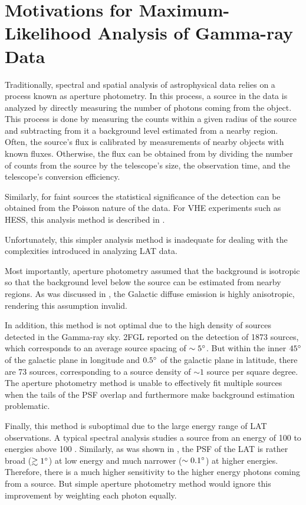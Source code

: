 \section{Motivations for Maximum-Likelihood Analysis of Gamma-ray Data}

Traditionally, spectral and spatial analysis of astrophysical data
relies on a process known as aperture photometry.  In this process,
a source in the data is analyzed by directly measuring the number of
photons coming from the object. This process is done by measuring the
counts within a given radius of the source and subtracting from it a
background level estimated from a nearby region.  Often, the source's
flux is calibrated by measurements of nearby objects with known fluxes.
Otherwise, the flux can be obtained from by dividing the number of
counts from the source by the telescope's size, the observation time,
and the telescope's conversion efficiency.

Similarly, for faint sources the statistical significance of the detection
can be obtained from the Poisson nature of the data. For \ac{VHE}
experiments such as \ac{HESS}, this analysis method is described in
\cite{li_1983_analysis-methods}.

Unfortunately, this simpler analysis method is inadequate for dealing
with the complexities introduced in analyzing LAT data.

Most importantly, aperture photometry assumed that the
background is isotropic so that the background level below the
source can be estimated from nearby regions.  As was discussed in
, the Galactic diffuse emission
is highly anisotropic, rendering this assumption invalid.

In addition, this method is not optimal due to the high density of sources
detected in the Gamma-ray sky.  \Ac{2FGL} reported on the detection
of 1873 sources, which corresponds to an average source spacing of
$\sim5^\circ$.  But within the inner $45^\circ$ of the galactic plane
in longitude and $0.5^\circ$ of the galactic plane in latitude, there
are 73 sources, corresponding to a source density of $\sim 1$ source per
square degree.  The aperture photometry method is unable to effectively
fit multiple sources when the tails of the PSF overlap and furthermore
make background estimation problematic.

Finally, this method is suboptimal due to the large energy range of
LAT observations.  A typical spectral analysis studies a source from an
energy of 100 \mev to energies above 100 \gev.  Similarly, as was shown
in , the PSF of the LAT is rather broad ($\gtrsim
1^\circ$) at low energy and much narrower ($\sim 0.1^\circ$) at higher
energies. Therefore, there is a much higher sensitivity to the higher
energy photons coming from a source.  But simple aperture photometry
method would ignore this improvement by weighting each photon equally.
